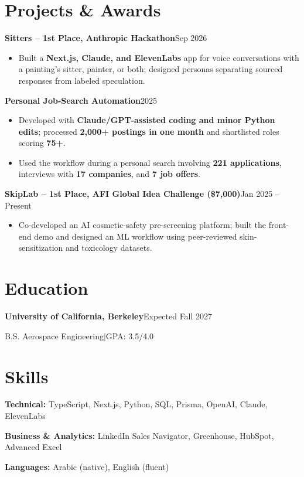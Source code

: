\documentclass[a4paper,10pt]{article}
\newcommand{\project}[2]{\textbf{#1}\hfill #2\par}
\begin{document}
\section{Projects \& Awards}
\project{Sitters -- 1st Place, Anthropic Hackathon}{Sep 2026}
\begin{itemize}
  \item Built a \textbf{Next.js, Claude, and ElevenLabs} app for voice conversations with a painting's sitter, painter, or both; designed personas separating sourced responses from labeled speculation.
\end{itemize}
\project{Personal Job-Search Automation}{2025}
\begin{itemize}
  \item Developed with \textbf{Claude/GPT-assisted coding and minor Python edits}; processed \textbf{2,000+ postings in one month} and shortlisted roles scoring \textbf{75+}.
  \item Used the workflow during a personal search involving \textbf{221 applications}, interviews with \textbf{17 companies}, and \textbf{7 job offers}.
\end{itemize}
\project{SkipLab -- 1st Place, AFI Global Idea Challenge (\$7,000)}{Jan 2025 -- Present}
\begin{itemize}
  \item Co-developed an AI cosmetic-safety pre-screening platform; built the front-end demo and designed an ML workflow using peer-reviewed skin-sensitization and toxicology datasets.
\end{itemize}

\section{Education}
\textbf{University of California, Berkeley}\hfill Expected Fall 2027\par
B.S. Aerospace Engineering\enspace$|$\enspace GPA: 3.5/4.0\par

\section{Skills}
\textbf{Technical:} TypeScript, Next.js, Python, SQL, Prisma, OpenAI, Claude, ElevenLabs\par
\textbf{Business \& Analytics:} LinkedIn Sales Navigator, Greenhouse, HubSpot, Advanced Excel\par
\textbf{Languages:} Arabic (native), English (fluent)
\end{document}
